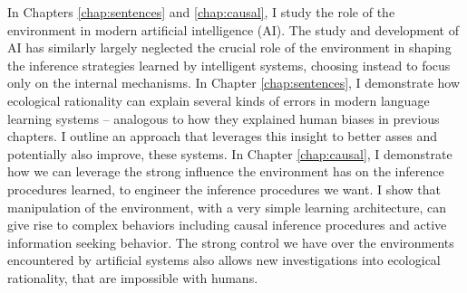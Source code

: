 In Chapters \ref{chap:sentences} and \ref{chap:causal}, I study the role of the environment in modern artificial intelligence (AI). The study and development of AI has similarly largely neglected the crucial role of the environment in shaping the inference strategies learned by intelligent systems, choosing instead to focus only on the internal mechanisms. In Chapter \ref{chap:sentences}, I demonstrate how ecological rationality can explain several kinds of errors in modern language learning systems -- analogous to how they explained human biases in previous chapters. I outline an approach that leverages this insight to better asses and potentially also improve, these systems. In Chapter \ref{chap:causal}, I demonstrate how we can leverage the strong influence the environment has on the inference procedures learned, to engineer the inference procedures we want. I show that manipulation of the environment, with a very simple learning architecture, can give rise to complex behaviors including causal inference procedures and active information seeking behavior. The strong control we have over the environments encountered by artificial systems also allows new investigations into ecological rationality, that are impossible with humans.